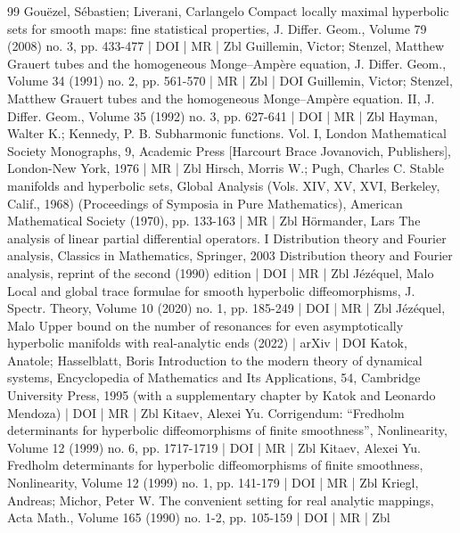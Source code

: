 \documentclass[10pt]{amsart}
\theoremstyle{definition}\newtheorem{defi}[theo]{Definition}\newtheorem{rema}[theo]{Remark}\newtheorem{exam}[theo]{Example}\newtheorem{exem}[theo]{Example}\newtheorem{nota}[theo]{Notation}
\begin{document}
\begin{thebibliography}{99}
 Gouëzel, Sébastien; Liverani, Carlangelo Compact locally maximal hyperbolic sets for smooth maps: fine statistical properties, J. Differ. Geom., Volume 79 (2008) no. 3, pp. 433-477 | DOI | MR | Zbl
 Guillemin, Victor; Stenzel, Matthew Grauert tubes and the homogeneous Monge–Ampère equation, J. Differ. Geom., Volume 34 (1991) no. 2, pp. 561-570 | MR | Zbl | DOI
 Guillemin, Victor; Stenzel, Matthew Grauert tubes and the homogeneous Monge–Ampère equation. II, J. Differ. Geom., Volume 35 (1992) no. 3, pp. 627-641 | DOI | MR | Zbl
 Hayman, Walter K.; Kennedy, P. B. Subharmonic functions. Vol. I, London Mathematical Society Monographs, 9, Academic Press [Harcourt Brace Jovanovich, Publishers], London-New York, 1976 | MR | Zbl
 Hirsch, Morris W.; Pugh, Charles C. Stable manifolds and hyperbolic sets, Global Analysis (Vols. XIV, XV, XVI, Berkeley, Calif., 1968) (Proceedings of Symposia in Pure Mathematics), American Mathematical Society (1970), pp. 133-163 | MR | Zbl
 Hörmander, Lars The analysis of linear partial differential operators. I Distribution theory and Fourier analysis, Classics in Mathematics, Springer, 2003 Distribution theory and Fourier analysis, reprint of the second (1990) edition | DOI | MR | Zbl
 Jézéquel, Malo Local and global trace formulae for smooth hyperbolic diffeomorphisms, J. Spectr. Theory, Volume 10 (2020) no. 1, pp. 185-249 | DOI | MR | Zbl
 Jézéquel, Malo Upper bound on the number of resonances for even asymptotically hyperbolic manifolds with real-analytic ends (2022) | arXiv | DOI
 Katok, Anatole; Hasselblatt, Boris Introduction to the modern theory of dynamical systems, Encyclopedia of Mathematics and Its Applications, 54, Cambridge University Press, 1995 (with a supplementary chapter by Katok and Leonardo Mendoza) | DOI | MR | Zbl
 Kitaev, Alexei Yu. Corrigendum: “Fredholm determinants for hyperbolic diffeomorphisms of finite smoothness”, Nonlinearity, Volume 12 (1999) no. 6, pp. 1717-1719 | DOI | MR | Zbl
 Kitaev, Alexei Yu. Fredholm determinants for hyperbolic diffeomorphisms of finite smoothness, Nonlinearity, Volume 12 (1999) no. 1, pp. 141-179 | DOI | MR | Zbl
 Kriegl, Andreas; Michor, Peter W. The convenient setting for real analytic mappings, Acta Math., Volume 165 (1990) no. 1-2, pp. 105-159 | DOI | MR | Zbl

\end{thebibliography}
\end{document}
